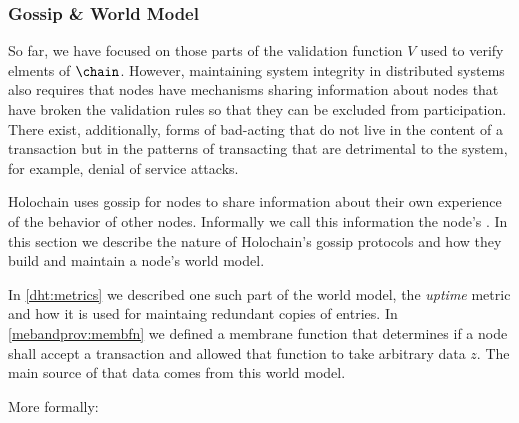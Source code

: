 \documentclass[twocolumn,showpacs,%
  nofootinbib,aps,superscriptaddress,%
  eqsecnum,prd,notitlepage,showkeys,10pt]{revtex4-1}
\begin{document}
\subsubsection{Gossip \& World Model}
\label{sec:gossip}

So far, we have focused on those parts of the validation function $V$ used to verify elments of $\chain$.  However, maintaining system integrity in distributed systems also requires that nodes have mechanisms sharing information about nodes that have broken the validation rules so that they can be excluded from participation. There exist, additionally, forms of bad-acting that do not live in the content of a transaction but in the patterns of transacting that are detrimental to the system, for example, denial of service attacks.

Holochain uses gossip for nodes to share information about their own experience of the behavior of other nodes.  Informally we call this information the node's . In this section we describe the nature of Holochain's gossip protocols and how they build and maintain a node's world model.

In \ref{dht:metrics} we described one such part of the world model, the \textit{uptime} metric and how it is used for maintaing redundant copies of entries.  In \ref{mebandprov:membfn} we defined a membrane function that determines if a node shall accept a transaction and allowed that function to take arbitrary data $z$.  The main source of that data comes from this world model.


More formally:
\end{document}
